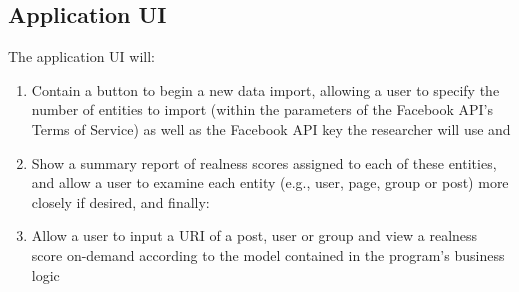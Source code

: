 \documentclass{article}
\begin{document}
\subsection*{Application UI}

The application UI will:
\begin{enumerate}
\item Contain a button to begin a new data import, allowing a user to specify the number of entities to import (within the parameters of the Facebook API's Terms of Service) as well as the Facebook API key the researcher will use and
\item Show a summary report of realness scores assigned to each of these entities, and allow a user to examine each entity (e.g., user, page, group or post) more closely if desired, and finally:
\item Allow a user to input a URI of a post, user or group and view a realness score on-demand according to the model contained in the program's business logic
\end{enumerate}




\end{document}
